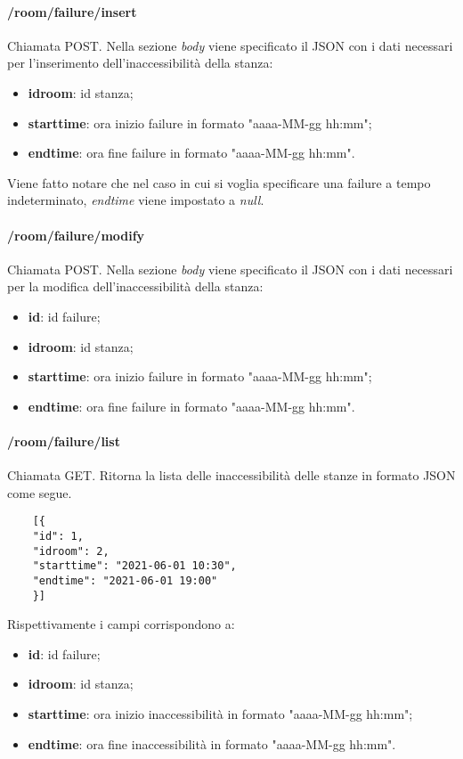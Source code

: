 \paragraph{/room/failure/insert}
Chiamata POST. Nella sezione \textit{body} viene specificato il JSON con i dati necessari per l'inserimento dell'inaccessibilità della stanza:
\begin{itemize}
	\item \textbf{idroom}: id stanza;
	\item \textbf{starttime}: ora inizio failure in formato "aaaa-MM-gg hh:mm";
	\item \textbf{endtime}: ora fine failure in formato "aaaa-MM-gg hh:mm".
\end{itemize}
Viene fatto notare che nel caso in cui si voglia specificare una failure a tempo indeterminato, \textit{endtime} viene impostato a \textit{null}.
\paragraph{/room/failure/modify}
Chiamata POST. Nella sezione \textit{body} viene specificato il JSON con i dati necessari per la modifica dell'inaccessibilità della stanza:
\begin{itemize}
	\item \textbf{id}: id failure;
	\item \textbf{idroom}: id stanza;
	\item \textbf{starttime}: ora inizio failure in formato "aaaa-MM-gg hh:mm";
	\item \textbf{endtime}: ora fine failure in formato "aaaa-MM-gg hh:mm".
\end{itemize}
\paragraph{/room/failure/list}
Chiamata GET. Ritorna la lista delle inaccessibilità delle stanze in formato JSON come segue.	\\
\begin{center}
	\begin{lstlisting}
	[{
	"id": 1,
	"idroom": 2,
	"starttime": "2021-06-01 10:30",
	"endtime": "2021-06-01 19:00"
	}]
	\end{lstlisting}
\end{center}
Rispettivamente i campi corrispondono a:
\begin{itemize}
	\item \textbf{id}: id failure;
	\item \textbf{idroom}: id stanza;
	\item \textbf{starttime}: ora inizio inaccessibilità in formato "aaaa-MM-gg hh:mm";
	\item \textbf{endtime}: ora fine inaccessibilità in formato "aaaa-MM-gg hh:mm".
\end{itemize}
